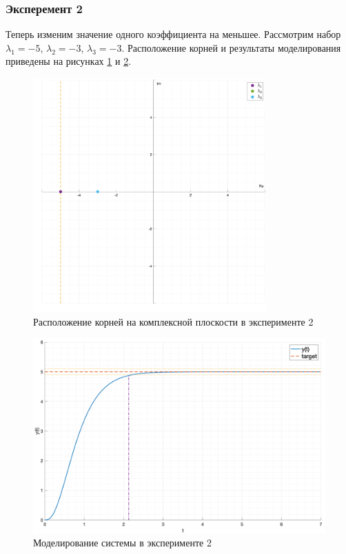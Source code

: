 \subsubsection{Эксперемент 2}
\label{task2_case2}

Теперь изменим значение одного коэффициента на меньшее. Рассмотрим набор 
$\lambda_1 = -5$, $\lambda_2 = -3$, $\lambda_3 = -3$. Расположение корней 
и результаты моделирования приведены на рисунках \ref{fig:task_2_points2} и
\ref{fig:task_2_case2}.

\begin{figure}
    \centering
    \includegraphics[width=0.8\textwidth]{media/plots/task2_points2.png}
    \caption{Расположение корней на комплексной плоскости в эксперименте 2}
    \label{fig:task_2_points2}
\end{figure}

\begin{figure}
    \centering
    \includegraphics[width=\textwidth]{media/plots/task2_case2.png}
    \caption{Моделирование системы в эксперименте 2}
    \label{fig:task_2_case2}
\end{figure}

